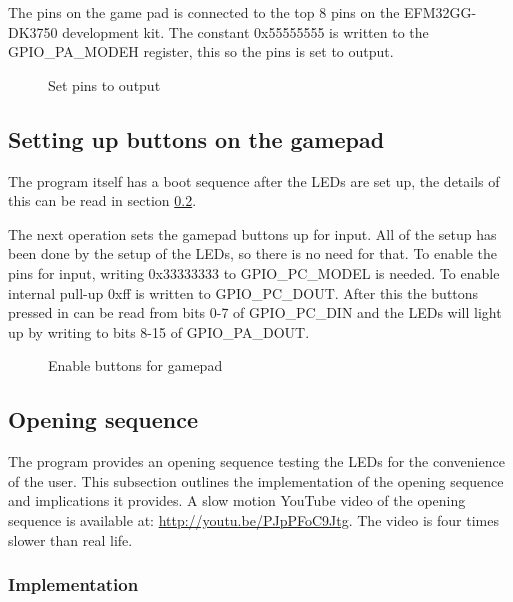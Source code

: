 The pins on the game pad is connected to the top 8 pins on the EFM32GG-DK3750 development kit. The constant 0x55555555 is written to the GPIO\_PA\_MODEH register, this so the pins is set to output.

\begin{figure}[h!]
\caption{Set pins to output}
\label{code:set_drive_gpio_o}
\end{figure}

\subsection{Setting up buttons on the gamepad}
\label{subsec:dev_pros_button_setup}
The program itself has a boot sequence after the LEDs are set up, the details of this can be read in section \ref{subsec:dev_pros_opening_seq}.

The next operation sets the gamepad buttons up for input. All of the setup has been done by the setup of the LEDs, so there is no need for that. To enable the pins for input, writing 0x33333333 to GPIO\_PC\_MODEL is needed. To enable internal pull-up 0xff is written to GPIO\_PC\_DOUT. After this the buttons pressed in can be read from bits 0-7 of GPIO\_PC\_DIN and the LEDs will light up by writing to bits 8-15 of GPIO\_PA\_DOUT.

\begin{figure}[h!]
\caption{Enable buttons for gamepad}
\label{code:set_drive_gpio_o}
\end{figure}

\subsection{Opening sequence}
\label{subsec:dev_pros_opening_seq}

The program provides an opening sequence testing the LEDs for the convenience of the user. This subsection outlines the implementation of the opening sequence and implications it provides. A slow motion YouTube video of the opening sequence is available at: \url{http://youtu.be/PJpPFoC9Jtg}. The video is four times slower than real life.

\subsubsection{Implementation}

